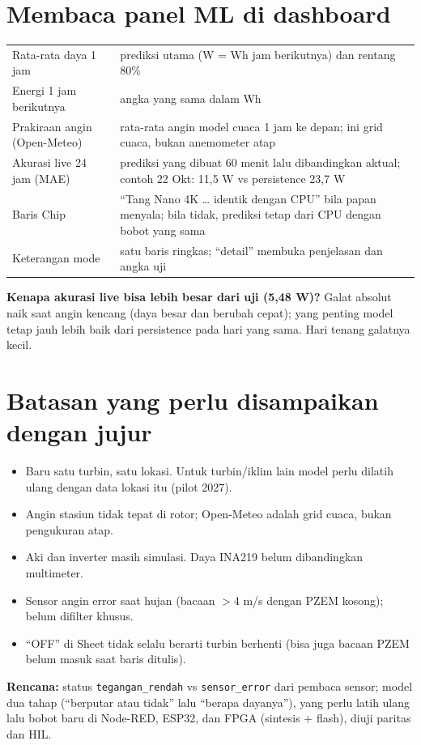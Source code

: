 \documentclass[10.5pt,a4paper]{article}
\newcommand{\cmd}[1]{\texttt{#1}}
\begin{document}
\section{Membaca panel ML di dashboard}
\begin{tabularx}{\linewidth}{@{}l X@{}}
\toprule
Rata-rata daya 1 jam & prediksi utama (W = Wh jam berikutnya) dan rentang 80\% \\
Energi 1 jam berikutnya & angka yang sama dalam Wh \\
Prakiraan angin (Open-Meteo) & rata-rata angin model cuaca 1 jam ke depan; ini grid cuaca, bukan anemometer atap \\
Akurasi live 24 jam (MAE) & prediksi yang dibuat 60 menit lalu dibandingkan aktual; contoh 22 Okt: 11,5 W vs persistence 23,7 W \\
Baris Chip & ``Tang Nano 4K \ldots{} identik dengan CPU'' bila papan menyala; bila tidak, prediksi tetap dari CPU dengan bobot yang sama \\
Keterangan mode & satu baris ringkas; ``detail'' membuka penjelasan dan angka uji \\
\bottomrule
\end{tabularx}
\textbf{Kenapa akurasi live bisa lebih besar dari uji (5,48 W)?} Galat absolut naik saat angin kencang (daya besar dan berubah cepat);
yang penting model tetap jauh lebih baik dari persistence pada hari yang sama. Hari tenang galatnya kecil.

\section{Batasan yang perlu disampaikan dengan jujur}
\begin{itemize}
  \item Baru satu turbin, satu lokasi. Untuk turbin/iklim lain model perlu dilatih ulang dengan data lokasi itu (pilot 2027).
  \item Angin stasiun tidak tepat di rotor; Open-Meteo adalah grid cuaca, bukan pengukuran atap.
  \item Aki dan inverter masih simulasi. Daya INA219 belum dibandingkan multimeter.
  \item Sensor angin error saat hujan (bacaan $>$4 m/s dengan PZEM kosong); belum difilter khusus.
  \item ``OFF'' di Sheet tidak selalu berarti turbin berhenti (bisa juga bacaan PZEM belum masuk saat baris ditulis).
\end{itemize}
\textbf{Rencana:} status \cmd{tegangan\_rendah} vs \cmd{sensor\_error} dari pembaca sensor; model dua tahap (``berputar atau tidak'' lalu
``berapa dayanya''), yang perlu latih ulang lalu bobot baru di Node-RED, ESP32, dan FPGA (sintesis + flash), diuji paritas dan HIL.
\end{document}
